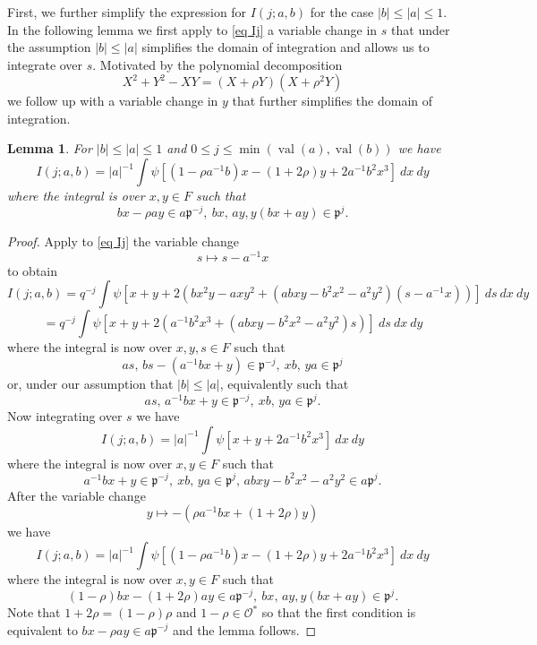 \documentclass[12pt]{amsart}
\newcommand{\abs}[1]{\left|{#1}\right|}
\newcommand{\p}{\mathfrak{p}}
\renewcommand{\O}{\mathcal{O}}
\newcommand{\val}{{\operatorname{val}}}
\newtheorem{lemma}[theorem]{Lemma}
\theoremstyle{remark}
\begin{document}
\subsubsection{} First, we further simplify the expression for $I(j;a,b)$ for the case $\abs{b}\le \abs{a}\le 1$. In the following lemma we first apply to \eqref{eq Ij} a variable change 
in $s$ that under the assumption $\abs{b}\le \abs{a}$ simplifies the domain of integration and allows us to integrate over $s$. Motivated by the polynomial decomposition
\[
X^2+Y^2-XY=(X+\rho Y)(X+\rho^2 Y)
\]
we follow up with a variable change in $y$ that further simplifies the domain of integration.
\begin{lemma}\label{lem s int}
For $\abs{b}\le \abs{a}\le 1$ and $0\le j\le \min(\val(a),\val(b))$ we have
\begin{equation}\label{eq I}
I(j;a,b)
=\abs{a}^{-1} \int \psi[(1-\rho a^{-1}b)x-(1+2\rho)y+2a^{-1}b^2x^3]  \ dx\ dy
\end{equation}
where the integral is over $x,y\in F$ such that
\begin{equation}\label{eq Ij domain}
bx-\rho ay\in a\p^{-j},\ bx,\,ay, y(bx+ay) \in \p^j.
\end{equation}
\end{lemma}
\begin{proof}
Apply to \eqref{eq Ij} the variable change 
\[
s\mapsto s-a^{-1}x
\] 
to obtain
\[
I(j;a,b)=q^{-j} \int \psi[x+y+2\left(bx^2y-axy^2+(abxy-b^2x^2-a^2y^2)(s-a^{-1}x)\right)]  \ ds\ dx\ dy
\]
\[
=q^{-j} \int \psi[x+y+2\left(a^{-1}b^2x^3+(abxy-b^2x^2-a^2y^2)s\right)]  \ ds\ dx\ dy
\]
where the integral is now over $x,y,s\in F$ such that
\[
as,\,bs-(a^{-1}bx+y)\in \p^{-j},\ xb,\,ya \in \p^j
\]
or, under our assumption that $\abs{b}\le \abs{a}$, equivalently such that 
\[
as,\,a^{-1}bx+y\in \p^{-j},\ xb,\,ya \in \p^j.
\]
Now integrating over $s$ we have
\[
I(j;a,b)
=\abs{a}^{-1} \int \psi[x+y+2a^{-1}b^2x^3]  \ dx\ dy
\]
where the integral is now over $x,y\in F$ such that
\[
a^{-1}bx+y\in \p^{-j},\ xb,\,ya \in \p^j,\, abxy-b^2x^2-a^2y^2\in a\p^j.
\]
After the variable change  
\[
y\mapsto -(\rho a^{-1}b x+(1+2\rho)y)
\] 
we have
\[
I(j;a,b)
=\abs{a}^{-1} \int \psi[(1-\rho a^{-1}b)x-(1+2\rho)y+2a^{-1}b^2x^3]  \ dx\ dy
\]
where the integral is now over $x,y\in F$ such that
\[
(1-\rho)bx-(1+2\rho)ay\in a\p^{-j},\ bx,\,ay, y(bx+ay) \in \p^j.
\]
Note that $1+2\rho=(1-\rho)\rho$ and $1-\rho\in\O^*$ so that the first condition is equivalent to $bx-\rho ay\in a\p^{-j}$ and the lemma follows.
\end{proof}
\end{document}
